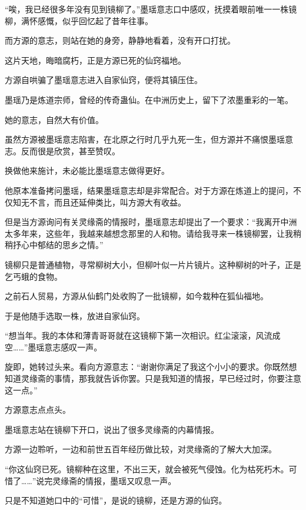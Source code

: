 
\begin{this_body}



“唉，我已经很多年没有见到镜柳了。”墨瑶意志口中感叹，抚摸着眼前唯一一株镜柳，满怀感慨，似乎回忆起了昔年往事。

而方源的意志，则站在她的身旁，静静地看着，没有开口打扰。

这片天地，晦暗腐朽，正是方源已死的仙窍福地。

方源自哄骗了墨瑶意志进入自家仙窍，便将其镇压住。

墨瑶乃是炼道宗师，曾经的传奇蛊仙。在中洲历史上，留下了浓墨重彩的一笔。

她的意志，自然大有价值。

虽然方源被墨瑶意志陷害，在北原之行时几乎九死一生，但方源并不痛恨墨瑶意志。反而很是欣赏，甚至赞叹。

换做他来施计，未必能比墨瑶意志做得更好。

他原本准备拷问墨瑶，结果墨瑶意志却是非常配合。对于方源在炼道上的提问，不仅知无不言，而且还延伸类比，叫方源大有收益。

但是当方源询问有关灵缘斋的情报时，墨瑶意志却提出了一个要求：“我离开中洲太多年来，这些年，我越来越想念那里的人和物。请给我寻来一株镜柳罢，让我稍稍抒心中郁结的思乡之情。”

镜柳只是普通植物，寻常柳树大小，但柳叶似一片片镜片。这种柳树的叶子，正是乞丐蛾的食物。

之前石人贸易，方源从仙鹤门处收购了一批镜柳，如今栽种在狐仙福地。

于是他随手选取一株，放进自家仙窍。

“想当年。我的本体和薄青哥哥就在这镜柳下第一次相识。红尘滚滚，风流成空……”墨瑶意志感叹一声。

旋即，她转过头来。看向方源意志：“谢谢你满足了我这个小小的要求。你既然想知道灵缘斋的事情，那我就告诉你罢。只是我知道的情报，早已经过时，你要注意这一点。”

方源意志点点头。

墨瑶意志站在镜柳下开口，说出了很多灵缘斋的内幕情报。

方源一边聆听，一边和前世五百年经历做比较，对灵缘斋的了解大大加深。

“你这仙窍已死。镜柳种在这里，不出三天，就会被死气侵蚀。化为枯死朽木。可惜了……”说完灵缘斋的情报，墨瑶又叹息一声。

只是不知道她口中的“可惜”，是说的镜柳，还是方源的仙窍。


\end{this_body}
